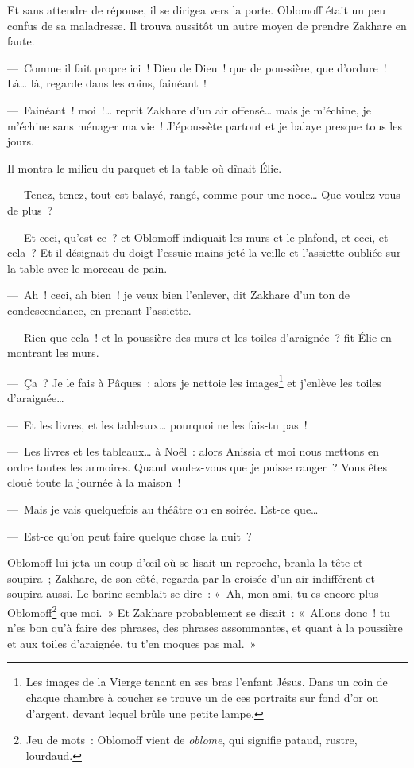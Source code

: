\documentclass[french,twoside]{book} %
\begin{document}
Et sans attendre de réponse, il se dirigea vers la porte. Oblomoff était un peu confus de sa maladresse. Il trouva aussitôt un autre moyen de prendre Zakhare en faute.\par
— Comme il fait propre ici ! Dieu de Dieu ! que de poussière, que d’ordure ! Là… là, regarde dans les coins, fainéant !\par
— Fainéant ! moi !… reprit Zakhare d’un air offensé… mais je m’échine, je m’échine sans ménager ma vie ! J’époussète partout et je balaye presque tous les jours.\par
Il montra le milieu du parquet et la table où dînait Élie.\par
— Tenez, tenez, tout est balayé, rangé, comme pour une noce… Que voulez-vous de plus ?\par
— Et ceci, qu’est-ce ? et Oblomoff indiquait les murs et le plafond, et ceci, et cela ? Et il désignait du doigt l’essuie-mains jeté la veille et l’assiette oubliée sur la table avec le morceau de pain.\par
— Ah ! ceci, ah bien ! je veux bien l’enlever, dit Zakhare d’un ton de condescendance, en prenant l’assiette.\par
— Rien que cela ! et la poussière des murs et les toiles d’araignée ? fit Élie en montrant les murs.\par
— Ça ? Je le fais à Pâques : alors je nettoie les images\footnote{Les images de la Vierge tenant en ses bras l’enfant Jésus. Dans un coin de chaque chambre à coucher se trouve un de ces portraits sur fond d’or on d’argent, devant lequel brûle une petite lampe.} et j’enlève les toiles d’araignée…\par
— Et les livres, et les tableaux… pourquoi ne les fais-tu pas !\par
— Les livres et les tableaux… à Noël : alors Anissia et moi nous mettons en ordre toutes les armoires. Quand voulez-vous que je puisse ranger ? Vous êtes cloué toute la journée à la maison !\par
— Mais je vais quelquefois au théâtre ou en soirée. Est-ce que…\par
— Est-ce qu’on peut faire quelque chose la nuit ?\par
Oblomoff lui jeta un coup d’œil où se lisait un reproche, branla la tête et soupira ; Zakhare, de son côté, regarda par la croisée d’un air indifférent et soupira aussi. Le barine semblait se dire : « Ah, mon ami, tu es encore plus Oblomoff\footnote{Jeu de mots : Oblomoff vient de \emph{oblome}, qui signifie pataud, rustre, lourdaud.} que moi. » Et Zakhare probablement se disait : « Allons donc ! tu n’es bon qu’à faire des phrases, des phrases assommantes, et quant à la poussière et aux toiles d’araignée, tu t’en moques pas mal. »\par
\end{document}
